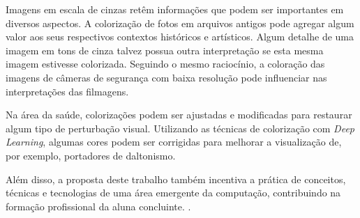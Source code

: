 Imagens em escala de cinzas retêm informações que podem ser importantes em diversos aspectos. A colorização de fotos em arquivos antigos pode agregar algum valor aos seus respectivos contextos históricos e artísticos. Algum detalhe de uma imagem em tons de cinza talvez possua outra interpretação se esta mesma imagem estivesse colorizada. Seguindo o mesmo raciocínio, a coloração das imagens de câmeras de segurança com baixa resolução pode influenciar nas interpretações das filmagens. 

Na área da saúde, colorizações podem ser ajustadas e modificadas para restaurar algum tipo de perturbação visual. Utilizando as técnicas de colorização com \textit{Deep Learning}, algumas cores podem ser corrigidas para melhorar a visualização de, por exemplo, portadores de daltonismo.

Além disso, a proposta deste trabalho também incentiva a prática de conceitos, técnicas e tecnologias de uma área emergente da computação, contribuindo na formação profissional da aluna concluinte. .
